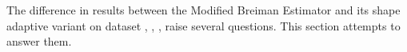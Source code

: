 
The difference in results between the Modified Breiman Estimator and its shape adaptive variant on dataset \ferdosiOne, \baakmanOne, \baakmanFour, \baakmanFive raise several questions. This section attempts to answer them.


